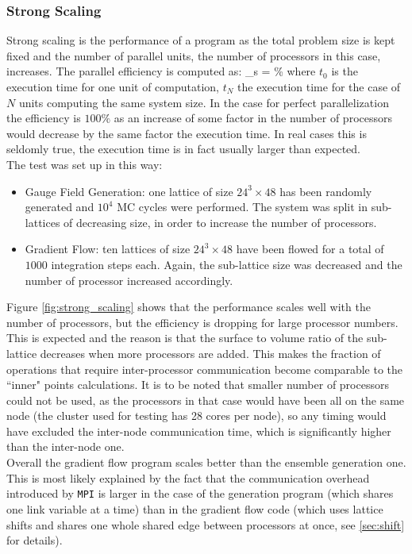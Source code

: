 \subsubsection{Strong Scaling}
Strong scaling is the performance of a program as the total problem size is kept fixed and the number of parallel units, the number of processors in this case, increases. The parallel efficiency is computed as:
\beq
    \eta_s = \% 
    \label{eq:eta_strong}
\eeq 
where $t_0$ is the execution time for one unit of computation, $t_N$ the execution time for the case of $N$ units computing the same system size. In the case for perfect parallelization the efficiency is $100\%$ as an increase of some factor in the number of processors would decrease by the same factor the execution time. In real cases this is seldomly true, the execution time is in fact usually larger than expected. \\
The test was set up in this way:
\begin{itemize}
    \item Gauge Field Generation: one lattice of size $24^3\times 48$ has been randomly generated and $10^4$ MC cycles were performed. The system was split in sub-lattices of decreasing size, in order to increase the number of processors.
    \item Gradient Flow: ten lattices of size $24^3\times 48$ have been flowed for a total of $1000$ integration steps each. Again, the sub-lattice size was decreased and the number of processor increased accordingly. 
\end{itemize}


Figure \ref{fig:strong_scaling} shows that the performance scales well with the number of processors, but the efficiency is dropping for large processor numbers. This is expected and the reason is that the surface to volume ratio of the sub-lattice decreases when more processors are added. This makes the fraction of operations that require inter-processor communication become comparable to the ``inner" points calculations. It is to be noted that smaller number of processors could not be used, as the processors in that case would have been all on the same node (the cluster used for testing has 28 cores per node), so any timing would have excluded the inter-node communication time, which is significantly higher than the inter-node one.\\
Overall the gradient flow program scales better than the ensemble generation one. This is most likely explained by the fact that the communication overhead introduced by \texttt{MPI} is larger in the case of the generation program (which shares one link variable at a time) than in the gradient flow code (which uses lattice shifts and shares one whole shared edge between processors at once, see \cref{sec:shift} for details).


